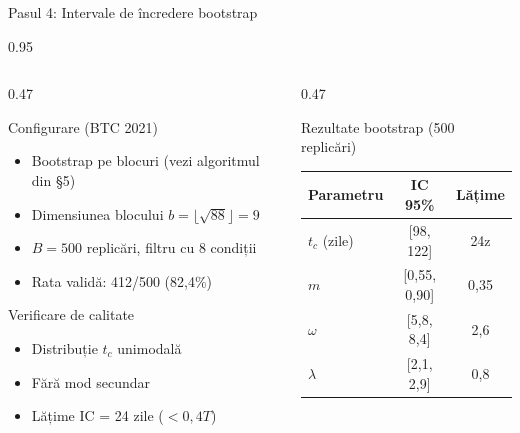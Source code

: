 \documentclass[9pt, aspectratio=169, t]{beamer}
\begin{document}
\begin{frame}{Pasul 4: Intervale de încredere bootstrap}
    \begin{cminipage}{0.95\textwidth}
    {\scriptsize
    \begin{columns}[T]
        \begin{column}{0.47\textwidth}
            \begin{block}{Configurare (BTC 2021)}
                \begin{itemize}\setlength{\itemsep}{1pt}
                    \item Bootstrap pe blocuri (vezi algoritmul din \S5)
                    \item Dimensiunea blocului $b = \lfloor\sqrt{88}\rfloor = 9$
                    \item $B = 500$ replicări, filtru cu 8 condiții
                    \item Rata validă: 412/500 (82,4\%)
                \end{itemize}
            \end{block}
            \begin{block}{Verificare de calitate}
                \begin{itemize}\setlength{\itemsep}{0pt}
                    \item Distribuție $t_c$ unimodală \textcolor{Forest}{\checkmark}
                    \item Fără mod secundar \textcolor{Forest}{\checkmark}
                    \item Lățime IC = 24 zile ($< 0{,}4T$) \textcolor{Forest}{\checkmark}
                \end{itemize}
            \end{block}
        \end{column}
        \begin{column}{0.47\textwidth}
            \begin{alertblock}{Rezultate bootstrap (500 replicări)}
                {\scriptsize
                \begin{tabular}{lcc}
                    \toprule
                    \textbf{Parametru} & \textbf{IC 95\%} & \textbf{Lățime} \\
                    \midrule
                    $t_c$ (zile) & [98, 122] & 24z \\
                    $m$ & [0,55, 0,90] & 0,35 \\
                    $\omega$ & [5,8, 8,4] & 2,6 \\
                    $\lambda$ & [2,1, 2,9] & 0,8 \\

\end{tabular}}
\end{alertblock}
\end{column}
\end{columns}}
\end{cminipage}
\end{frame}
\end{document}
